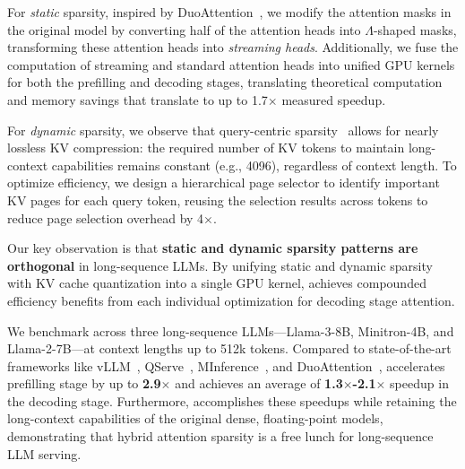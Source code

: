 For \textit{static} sparsity, inspired by DuoAttention~\cite{xiao2024duoattention}, we modify the attention masks in the original model by converting half of the attention heads into $\Lambda$-shaped masks, transforming these attention heads into \textit{streaming heads}. Additionally, we fuse the computation of streaming and standard attention heads into unified GPU kernels for both the prefilling and decoding stages, translating theoretical computation and memory savings that translate to up to 1.7$\times$ measured speedup. 

For \textit{dynamic} sparsity, we observe that query-centric sparsity~\cite{tang2024quest} allows for nearly lossless KV compression: the required number of KV tokens to maintain long-context capabilities remains constant (e.g., 4096), regardless of context length. To optimize efficiency, we design a hierarchical page selector to identify important KV pages for each query token, reusing the selection results across tokens to reduce page selection overhead by 4$\times$. 

Our key observation is that \textbf{static and dynamic sparsity patterns are orthogonal} in long-sequence LLMs. By unifying static and dynamic sparsity with KV cache quantization into a single GPU kernel, \system achieves compounded efficiency benefits from each individual optimization for decoding stage attention.

We benchmark \system across three long-sequence LLMs—Llama-3-8B, Minitron-4B, and Llama-2-7B—at context lengths up to 512k tokens. Compared to state-of-the-art frameworks like vLLM~\cite{vllm}, QServe~\cite{lin2024qserve}, MInference~\cite{jiang2024minference}, and DuoAttention~\cite{xiao2024duoattention}, \system accelerates prefilling stage by up to \textbf{2.9$\times$} and achieves an average of \textbf{1.3$\times$-2.1$\times$} speedup in the decoding stage. Furthermore, \system accomplishes these speedups while retaining the long-context capabilities of the original dense, floating-point models, demonstrating that hybrid attention sparsity is a free lunch for long-sequence LLM serving.





























